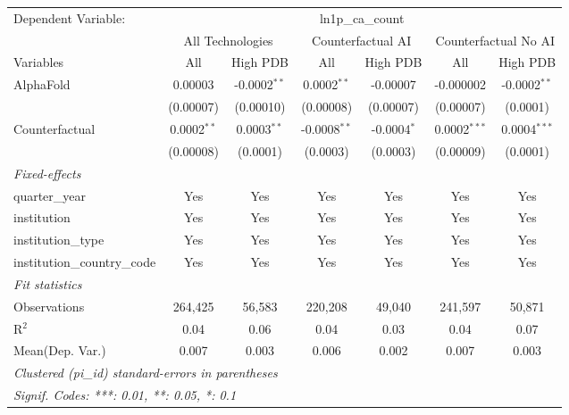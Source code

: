 \begingroup
\centering
\begin{tabular}{lcccccc}
   \tabularnewline \midrule \midrule
   Dependent Variable: & \multicolumn{6}{c}{ln1p\_ca\_count}\\
 & \multicolumn{2}{c}{All Technologies} & \multicolumn{2}{c}{Counterfactual AI} & \multicolumn{2}{c}{Counterfactual No AI} \\
\cmidrule(lr){1-1}\cmidrule(lr){2-3} \cmidrule(lr){4-5} \cmidrule(lr){6-7}
Variables & \multicolumn{1}{c}{All} & \multicolumn{1}{c}{High PDB} & \multicolumn{1}{c}{All} & \multicolumn{1}{c}{High PDB} & \multicolumn{1}{c}{All} & \multicolumn{1}{c}{High PDB} \\
\cmidrule(lr){1-1}\cmidrule(lr){2-2} \cmidrule(lr){3-3} \cmidrule(lr){4-4} \cmidrule(lr){5-5} \cmidrule(lr){6-6} \cmidrule(lr){7-7}
   AlphaFold                    & 0.00003       & -0.0002$^{**}$ & 0.0002$^{**}$  & -0.00007      & -0.000002      & -0.0002$^{**}$\\   
                                & (0.00007)     & (0.00010)      & (0.00008)      & (0.00007)     & (0.00007)      & (0.0001)\\   
   Counterfactual               & 0.0002$^{**}$ & 0.0003$^{**}$  & -0.0008$^{**}$ & -0.0004$^{*}$ & 0.0002$^{***}$ & 0.0004$^{***}$\\   
                                & (0.00008)     & (0.0001)       & (0.0003)       & (0.0003)      & (0.00009)      & (0.0001)\\   
   \midrule
   \emph{Fixed-effects}\\
   quarter\_year                & Yes           & Yes            & Yes            & Yes           & Yes            & Yes\\  
   institution                  & Yes           & Yes            & Yes            & Yes           & Yes            & Yes\\  
   institution\_type            & Yes           & Yes            & Yes            & Yes           & Yes            & Yes\\  
   institution\_country\_code   & Yes           & Yes            & Yes            & Yes           & Yes            & Yes\\  
   \midrule
   \emph{Fit statistics}\\
   Observations                 & 264,425       & 56,583         & 220,208        & 49,040        & 241,597        & 50,871\\  
   R$^2$                        & 0.04          & 0.06           & 0.04           & 0.03          & 0.04           & 0.07\\  
Mean(Dep. Var.) & 0.007 & 0.003 & 0.006 & 0.002 & 0.007 & 0.003 \\
   \midrule \midrule
   \multicolumn{7}{l}{\emph{Clustered (pi\_id) standard-errors in parentheses}}\\
   \multicolumn{7}{l}{\emph{Signif. Codes: ***: 0.01, **: 0.05, *: 0.1}}\\
\end{tabular}
\par\endgroup
